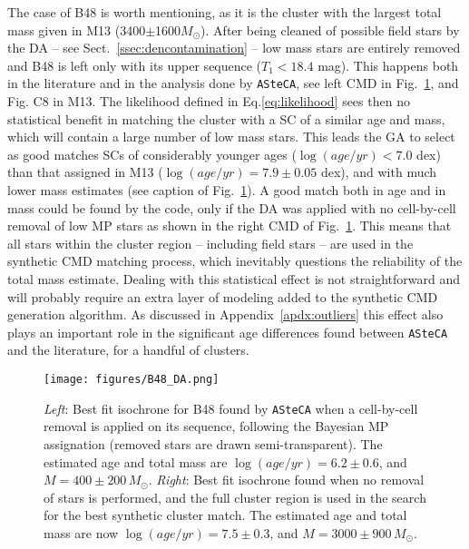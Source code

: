 \documentclass[draft]{aa}
\begin{document}
The case of B48 is worth mentioning, as it is the cluster with the largest total
mass given in M13 (3400$\pm$1600$M_{\odot}$).
After being cleaned of possible field stars by the DA -- see
Sect.~\ref{ssec:dencontamination} -- low mass stars are entirely removed and B48
is left only with its upper sequence ($T_1<18.4$ mag).
This happens both in the literature and in the analysis done by \texttt{ASteCA},
see left CMD in Fig.~\ref{fig:B48_DA}, and Fig. C8 in M13.
%
The likelihood defined in Eq.\ref{eq:likelihood} sees then no statistical
benefit in matching the cluster with a SC of a similar age and mass,
which will contain a large number of low mass stars.
This leads the GA to select as good matches SCs of considerably
younger ages ($\log(age/yr){<}7.0$ dex) than that assigned in M13
($\log(age/yr){=}7.9\pm0.05$ dex), and with much lower mass estimates (see
caption of Fig.~\ref{fig:B48_DA}).
%
%
A good match both in age and in mass could be found by the code, only if the DA
was applied with no cell-by-cell removal of low MP stars as shown in the right
CMD of Fig.~\ref{fig:B48_DA}. This means that all stars within the cluster
region -- including field stars -- are used in the synthetic CMD matching
process, which inevitably questions the reliability of the total mass estimate.
%
Dealing with this statistical effect is not straightforward and will probably
require an extra layer of modeling added to the synthetic CMD generation
algorithm.
As discussed in Appendix~\ref{apdx:outliers} this effect also plays an
important role in the significant age differences found between \texttt{ASteCA}
and the literature, for a handful of clusters.

\begin{figure}
\centering
\texttt{[image: figures/B48\_DA.png]}
\caption{\emph{Left}: Best fit isochrone for B48 found by \texttt{ASteCA} when
a cell-by-cell removal is applied on its sequence, following the Bayesian MP
assignation (removed stars are drawn semi-transparent). The estimated age and
total mass are $\log(age/yr){=}6.2{\pm}0.6$, and $M{=}400{\pm}200\,M_{\odot}$.
\emph{Right}: Best fit isochrone found when no removal of stars is performed,
and the full cluster region is used in the search for the best synthetic
cluster match. The estimated age and total mass are now
$\log(age/yr){=}7.5{\pm}0.3$, and $M{=}3000{\pm}900\,M_{\odot}$.}
\label{fig:B48_DA}
\end{figure}
\end{document}
